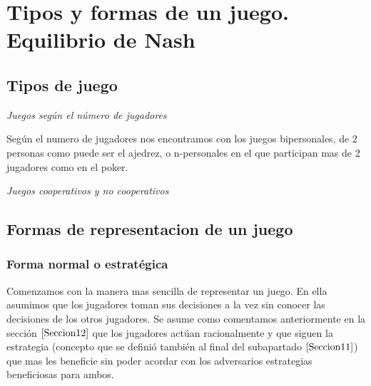 \documentclass[12pt,a4paper,]{book}
\title{}
\author{Nombre Completo Autor}
\date{18/11/2021}
\def\ifdoblecara{} %
\def\ifprincipal{} %
\let\ifprincipal\undefined %
\numberwithin{dummy}{section}
\theoremstyle{ocrenumbox}
\theoremstyle{blacknumex}
\theoremstyle{blacknumbox}
\theoremstyle{ocrenum}
\theoremstyle{ocrenum}
\begin{document}




\raggedbottom

\ifdefined\ifprincipal
\else
\setlength{\parindent}{1em}
\pagestyle{fancy}
\setcounter{tocdepth}{4}
\tableofcontents

\fi

\ifdefined\ifdoblecara
\fancyhead{}{}
\fancyhead[LE,RO]{\scriptsize\rightmark}
\fancyfoot[LO,RE]{\scriptsize\slshape \leftmark}
\fancyfoot[C]{}
\fancyfoot[LE,RO]{\footnotesize\thepage}
\else
\fancyhead{}{}
\fancyhead[RO]{\scriptsize\rightmark}
\fancyfoot[LO]{\scriptsize\slshape \leftmark}
\fancyfoot[C]{}
\fancyfoot[RO]{\footnotesize\thepage}
\fi

\renewcommand{\headrulewidth}{0.4pt}
\renewcommand{\footrulewidth}{0.4pt}

\hypertarget{Seccion2}{%
\chapter{Tipos y formas de un juego. Equilibrio de
Nash}\label{Seccion2}}

\hypertarget{Seccion21}{%
\section{Tipos de juego}\label{Seccion21}}

\emph{Juegos según el número de jugadores}

Según el numero de jugadores nos encontramos con los juegos
bipersonales, de 2 personas como puede ser el ajedrez, o n-personales en
el que participan mas de 2 jugadores como en el poker.

\emph{Juegos cooperativos y no cooperativos}

\hypertarget{Seccion22}{%
\section{Formas de representacion de un juego}\label{Seccion22}}

\hypertarget{Seccion221}{%
\subsection{Forma normal o estratégica}\label{Seccion221}}

Comenzamos con la manera mas sencilla de representar un juego. En ella
asumimos que los jugadores toman sus decisiones a la vez sin conocer las
decisiones de los otros jugadores. Se asume como comentamos
anteriormente en la sección \(\ref{Seccion12}\) que los jugadores actúan
racionalmente y que siguen la estrategia (concepto que se definió
también al final del subapartado \(\ref{Seccion11}\)) que mas les
beneficie sin poder acordar con los adversarios estrategias beneficiosas
para ambos.
\end{document}
